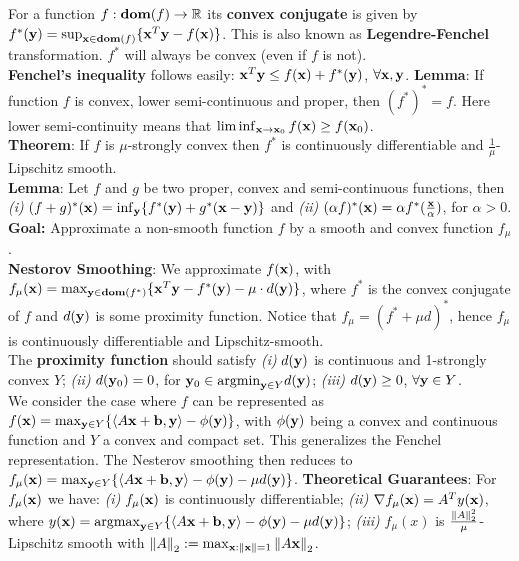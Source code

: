  For a function $f : \textbf{dom}(f) \rightarrow \mathbb{R}$ its \textbf{convex conjugate} is given by $f^*( \mathbf{y}) = \sup_{\mathbf{x} \in \textbf{dom}(f)}\{\mathbf{x}^T \mathbf{y} - f(\mathbf{x})\}$. This is also known as \textbf{Legendre-Fenchel} transformation. $f^*$ will always be convex (even if $f$ is not). \\
\textbf{Fenchel's inequality} follows easily: $\mathbf{x}^T \mathbf{y} \leq f(\mathbf{x}) + f^*(\mathbf{y})$, $\forall \mathbf{x}, \mathbf{y}$.
\textbf{Lemma}: If function $f$ is convex, lower semi-continuous and proper, then $(f^*)^* = f$. Here lower semi-continuity means that $\lim \inf_{\mathbf{x} \rightarrow \mathbf{x}_0} f(\mathbf{x}) \geq f(\mathbf{x}_0)$. \\
\textbf{Theorem}: If $f$ is $\mu$-strongly convex then $f^*$ is continuously differentiable and $\frac{1}{\mu}$-Lipschitz smooth. \\
\textbf{Lemma}: Let $f$ and $g$ be two proper, convex and semi-continuous functions, then \textit{(i)} $(f+g)^*(\mathbf{x}) = \inf_{\mathbf{y}}\{f^*(\mathbf{y}) + g^*(\mathbf{x} - \mathbf{y})\}$ and \textit{(ii)} $(\alpha f)^*(\mathbf{x}) = \alpha f^*(\frac{\mathbf{x}}{\alpha})$, for $\alpha > 0$. \\
\textbf{Goal:} Approximate a non-smooth function $f$ by a smooth and convex function $f_{\mu}$. \\
\textbf{Nestorov Smoothing}: We approximate $f(\mathbf{x})$, with $f_{\mu}(\mathbf{x}) = \max_{\mathbf{y} \in \textbf{dom}(f^*)}\{\mathbf{x}^T \mathbf{y} - f^*(\mathbf{y}) - \mu \cdot d(\mathbf{y})\}$, where $f^*$ is the convex conjugate of $f$ and $d(\mathbf{y})$ is some proximity function. Notice that $f_{\mu} = (f^* + \mu d)^*$, hence $f_{\mu}$ is continuously differentiable and Lipschitz-smooth. \\
The \textbf{proximity function} should satisfy \textit{(i)} $d(\mathbf{y})$ is continuous and 1-strongly convex $Y$; \textit{(ii)} $d(\mathbf{y}_0) = 0$, for $\mathbf{y}_0 \in \mathrm{argmin}_{\mathbf{y} \in Y}{d(\mathbf{y})}$; \textit{(iii)} $d(\mathbf{y}) \geq 0$, $\forall \mathbf{y} \in Y$. \\
We consider the case where $f$ can be represented as $f(\mathbf{x}) = \max_{\mathbf{y} \in Y} \{\langle A \mathbf{x} + \mathbf{b}, \mathbf{y} \rangle - \phi(\mathbf{y})\}$, with $\phi(\mathbf{y})$ being a convex and continuous function and $Y$ a convex and compact set. This generalizes the Fenchel representation. The Nesterov smoothing then reduces to $f_{\mu}(\mathbf{x}) = \max_{\mathbf{y} \in Y}\{\langle A\mathbf{x} + \mathbf{b}, \mathbf{y} \rangle - \phi(\mathbf{y}) - \mu d(\mathbf{y}) \}$.
\textbf{Theoretical Guarantees}: For $f_{\mu}(\mathbf{x})$ we have: \textit{(i)} $f_{\mu}(\mathbf{x})$ is continuously differentiable; \textit{(ii)} $\nabla f_{\mu}(\mathbf{x}) = A^T y(\mathbf{x})$, where $y(\mathbf{x}) = \mathrm{argmax}_{\mathbf{y} \in Y}\{\langle A \mathbf{x} + \mathbf{b}, \mathbf{y} \rangle - \phi(\mathbf{y}) - \mu d(\mathbf{y}) \}$; \textit{(iii)} $f_{\mu}(x)$ is $\frac{\norm{A}_2^2}{\mu}$-Lipschitz smooth with $\norm{A}_2 := \max_{\mathbf{x} : \norm{\mathbf{x}}=1}\norm{A\mathbf{x}}_2$. \\
